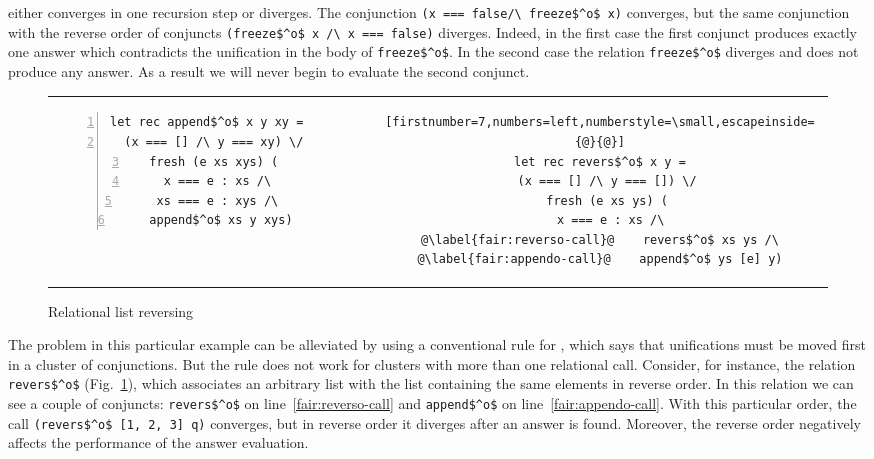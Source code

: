 \noindent either converges in one recursion step or diverges. The conjunction \lstinline{(x === false/\ freeze$^o$ x)} converges, but the same conjunction with the reverse order of conjuncts
\lstinline{(freeze$^o$ x /\ x === false)} diverges. Indeed, in the first case the first conjunct produces exactly one answer which contradicts the unification in the body
of \lstinline{freeze$^o$}. In the second case the relation \lstinline{freeze$^o$} diverges and does not produce any answer. As a result we will never begin to evaluate the second conjunct.

\begin{figure}[h!]
\centering
\begin{tabular}{cp{3cm}c}
\begin{lstlisting}[numbers=left,numberstyle=\small]
let rec append$^o$ x y xy =
  (x === [] /\ y === xy) \/
  fresh (e xs xys) (
    x === e : xs /\ 
    xs === e : xys /\ 
    append$^o$ xs y xys)
\end{lstlisting}
& &
\begin{lstlisting}[firstnumber=7,numbers=left,numberstyle=\small,escapeinside={@}{@}]
let rec revers$^o$ x y =
  (x === [] /\ y === []) \/
  fresh (e xs ys) (
    x === e : xs /\ 
@\label{fair:reverso-call}@    revers$^o$ xs ys /\
@\label{fair:appendo-call}@    append$^o$ ys [e] y)
\end{lstlisting}
\end{tabular}

\caption{Relational list reversing}
\label{fair:lst-reverso}
\end{figure}

The problem in this particular example can be alleviated by using a conventional rule for \mk, which says that unifications must be moved first in a cluster of conjunctions.
But the rule does not work for clusters with more than one relational call. Consider, for instance, the relation \lstinline{revers$^o$} (Fig.~\ref{fair:lst-reverso}), which associates
an arbitrary list with the list containing the same elements in reverse order. In this relation we can see a couple of conjuncts: \lstinline{revers$^o$} on line~\ref{fair:reverso-call} and
\lstinline{append$^o$} on line~\ref{fair:appendo-call}. With this particular order, the call \lstinline{(revers$^o$ [1, 2, 3] q)} converges, but in reverse order it diverges after an answer
is found. Moreover, the reverse order negatively affects the performance of the answer evaluation.

